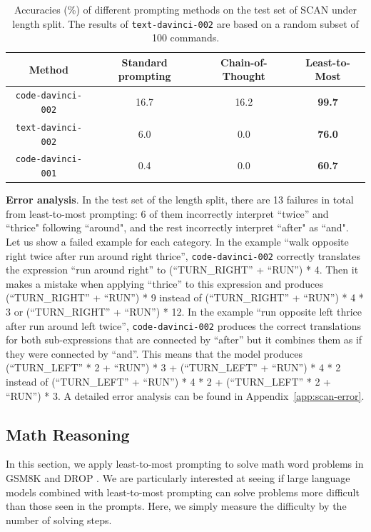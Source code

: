 \documentclass{article}
\begin{document}
\begin{table}[h!]
\centering
\begin{tabular}{ c|ccc }
  {Method} & {Standard prompting}  & {Chain-of-Thought}  & 
  {Least-to-Most} \\ 
  \hline
  \texttt{code-davinci-002}  &  16.7 & 16.2 & \textbf{99.7}\\ 
  \texttt{text-davinci-002} & 6.0  & 0.0 & \textbf{76.0}\\ 
 \texttt{code-davinci-001}  &  0.4 & 0.0  & \textbf{60.7}\\ 
\end{tabular}
\vspace{5pt}
\caption{Accuracies (\%) of different prompting methods on the test set of SCAN under length split. The results of \texttt{text-davinci-002} are based on a random subset of 100 commands.}
\label{table: scan-results}
\end{table}


\textbf{Error analysis}. In the test set of the length split, there are 13 failures in total from least-to-most prompting: 6 of them incorrectly interpret ``twice” and ``thrice" following ``around", and the rest incorrectly interpret ``after" as ``and". Let us show a failed example for each category. In the example ``walk opposite right twice after run around right thrice'', \texttt{code-davinci-002} correctly translates the expression ``run around right'' to (``TURN\_RIGHT'' + ``RUN'') * 4. Then it makes a mistake when applying ``thrice'' to this expression and produces (``TURN\_RIGHT'' + ``RUN'') * 9 instead of (``TURN\_RIGHT'' + ``RUN'') * 4 * 3 or (``TURN\_RIGHT'' + ``RUN'') * 12. In the example ``run opposite left thrice after run around left twice'', \texttt{code-davinci-002} produces the correct translations for both sub-expressions that are connected by ``after'' but it combines them as if they were connected by ``and''. This means that the model produces (``TURN\_LEFT'' * 2 + ``RUN'') * 3 + (``TURN\_LEFT'' + ``RUN'') * 4 * 2 instead of (``TURN\_LEFT'' + ``RUN'') * 4 * 2 + (``TURN\_LEFT'' * 2 + ``RUN'') * 3. A detailed error analysis can be found in Appendix~\ref{app:scan-error}.


\subsection{Math Reasoning}
\label{sec:numerical_reasoning}


In this section, we apply least-to-most prompting to solve math word problems in GSM8K \citep{cobbe2021training} and DROP \citep{dua2019drop}. We are particularly interested at seeing if large language models combined with least-to-most prompting can solve problems more difficult than those seen in the prompts. Here, we simply measure the difficulty by the number of solving steps. 
\end{document}
